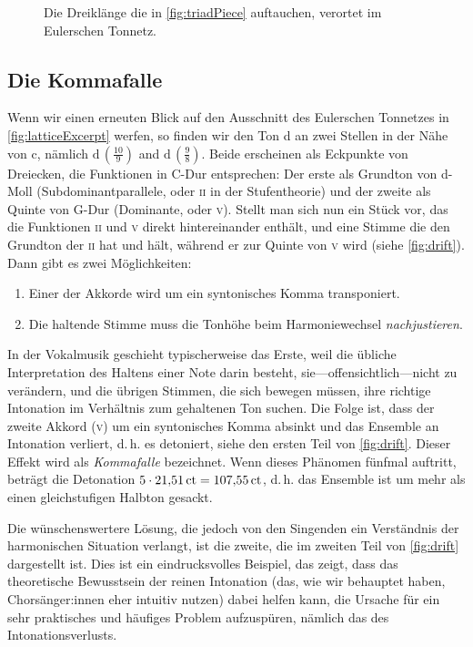 \begin{figure}
  
  \caption{Die Dreiklänge die in \cref{fig:triadPiece} auftauchen, verortet im
  	Eulerschen Tonnetz.}\label{fig:chordsLattice}
\end{figure}

\subsection{Die Kommafalle}

Wenn wir einen erneuten Blick auf den Ausschnitt des Eulerschen Tonnetzes in
\cref{fig:latticeExcerpt} werfen, so finden wir den Ton d an zwei Stellen in der
Nähe von c, nämlich \naturalm $\text{d}\,(\frac{10}9)$ and
$\text{d}\,(\frac98)$. Beide erscheinen als Eckpunkte von Dreiecken, die
Funktionen in C-Dur entsprechen: Der erste als Grundton von d-Moll
(Subdominantparallele, oder \textsc{ii} in der Stufentheorie) und der zweite als
Quinte von G-Dur (Dominante, oder \textsc{v}).  Stellt man sich nun ein Stück
vor, das die Funktionen \textsc{ii} und \textsc{v} direkt hintereinander
enthält, und eine Stimme die den Grundton der \textsc{ii} hat und hält, während
er zur Quinte von \textsc{v} wird (siehe \cref{fig:drift}). Dann gibt es zwei
Möglichkeiten:

\begin{enumerate}[itemsep=0em]
\item Einer der Akkorde wird um ein syntonisches Komma transponiert.
\item Die haltende Stimme muss die Tonhöhe beim Harmoniewechsel 
  \emph{nachjustieren}.
\end{enumerate}%
%
In der Vokalmusik geschieht typischerweise das Erste, weil die übliche
Interpretation des Haltens einer Note darin besteht, sie—offensichtlich—nicht zu
verändern, und die übrigen Stimmen, die sich bewegen müssen, ihre richtige
Intonation im Verhältnis zum gehaltenen Ton suchen. Die Folge ist, dass der
zweite Akkord (\textsc{v}) um ein syntonisches Komma absinkt und das Ensemble
an Intonation verliert, d.\,h. es detoniert, siehe den ersten Teil von
\cref{fig:drift}. Dieser Effekt wird als \emph{Kommafalle} bezeichnet. Wenn
dieses Phänomen fünfmal auftritt, beträgt die Detonation
$5\cdot 21{,}51\,\mathrm{ct}=107{,}55\,\mathrm{ct}$, d.\,h. das Ensemble ist um mehr als
einen gleichstufigen Halbton gesackt.

Die wünschenswertere Lösung, die jedoch von den Singenden ein Verständnis der
harmonischen Situation verlangt, ist die zweite, die im zweiten Teil von
\cref{fig:drift} dargestellt ist. Dies ist ein eindrucksvolles Beispiel, das
zeigt, dass das theoretische Bewusstsein der reinen Intonation (das, wie wir
behauptet haben, Chorsänger:innen eher intuitiv nutzen) dabei helfen kann, die
Ursache für ein sehr praktisches und häufiges Problem aufzuspüren, nämlich das
des Intonationsverlusts.

